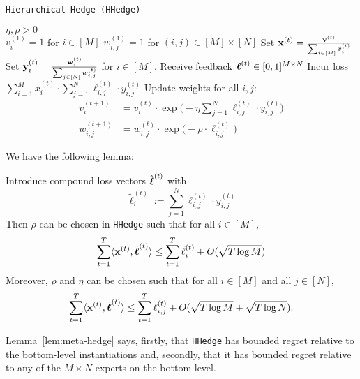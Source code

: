 \begin{algorithm}
   \caption{\texttt{Hierarchical Hedge (HHedge)}}
   \label{alg:meta-hedge}
   \begin{algorithmic}   
   	 $\eta,\rho>0$\\
   	\STATE $v^{(1)}_{i}=1$ for $i\in[M]$
   	\STATE $w^{(1)}_{i,j}=1$ for $(i,j)\in[M]\times[N]$
	   \STATE Set ${\mathbf x}^{(t)} = \frac{{\mathbf v}^{(t)}}{\sum_{i\in[M]} v^{(t)}_{i}}$
	   \STATE Set ${\mathbf y}^{(t)}_{i} = \frac{{\mathbf w}^{(t)}_{i}}{\sum_{j\in[N]} w^{(t)}_{i,j}}$ for $i\in[M]$.
		\STATE Receive feedback $\boldsymbol\ell^{(t)}\in [0,1]^{M\times N}$ %
		\STATE Incur loss $\sum_{i=1}^{M} x^{(t)}_{i}\cdot\sum_{j=1}^N\ell^{(t)}_{i,j}\cdot y^{(t)}_{i,j}$
		\STATE Update weights for all $i,j$:
		\begin{align}
			v^{(t+1)}_i & = v^{(t)}_{i}\cdot \exp\big(-\eta \sum_{j=1}^N\ell^{(t)}_{i,j}\cdot y^{(t)}_{i,j}\big)
			\\
			w^{(t+1)}_{i,j} & = w^{(t)}_{i,j}\cdot \exp\big(-\rho\cdot \ell^{(t)}_{i,j}\big)
		\end{align}
    	\ENDFOR
   	\end{algorithmic}
\end{algorithm}

We have the following lemma:

\begin{lem}\label{lem:meta-hedge}
	Introduce compound loss vectors $\tilde{\boldsymbol\ell}^{(t)}$ with 
	$$\tilde{\ell}^{(t)}_i := \sum_{j=1}^N \ell^{(t)}_{i,j}\cdot y^{(t)}_{i,j}$$
	Then $\rho$ can be chosen in \texttt{HHedge} such that for all $i\in[M]$,
	\begin{equation}
		\sum_{t=1}^T \langle {\mathbf x}^{(t)},\tilde{\boldsymbol\ell}^{(t)}\rangle 
		\leq  \sum_{t=1}^T \tilde{\ell}^{(t)}_i +
		 O(\sqrt{T \log M})
	\end{equation}
	Moreover, $\rho$ and $\eta$ can be chosen such that for all $i\in[M]$ and all $j\in[N]$,
	\begin{equation}
	   \sum_{t=1}^T \langle {\mathbf x}^{(t)},\tilde{\boldsymbol\ell}^{(t)}\rangle 
		\leq \sum_{t=1}^T\ell^{(t)}_{i,j}
		+ O(\sqrt{T \log M} + \sqrt{T \log N}).
	\end{equation}
\end{lem}

Lemma~\ref{lem:meta-hedge} says, firstly, that \texttt{HHedge} has bounded regret relative to the bottom-level instantiations and, secondly, that it has bounded regret relative to any of the $M\times N$ experts on the bottom-level.


